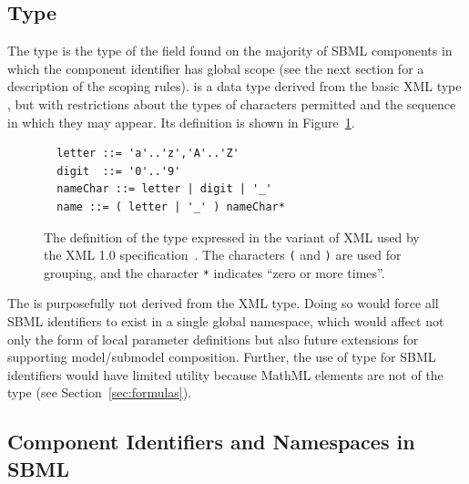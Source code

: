 \documentclass[10pt,twocolumntoc]{cekarticle}
\newcommand{\vref}[1]{\ref{#1}}
\begin{document}
\subsection{Type }
\label{sec:id}

The type  is the type of the  field found on the
majority of SBML components in which the component identifier has global
scope (see the next section for a description of the scoping rules).
 is a data type derived from the basic XML type ,
but with restrictions about the types of characters permitted and the
sequence in which they may appear.  Its definition is shown in
Figure~\vref{fig:id}.

\begin{figure}[h]
  \centering
  \begin{minipage}{3.8in}
\begin{verbatim}
  letter ::= 'a'..'z','A'..'Z'
  digit  ::= '0'..'9'
  nameChar ::= letter | digit | '_'
  name ::= ( letter | '_' ) nameChar*
\end{verbatim}
  \end{minipage}
  \caption{The definition of the type  expressed in the variant
    of XML used by the XML 1.0 specification~\protect\citep{bray:2000}.
    The characters \texttt{(} and \texttt{)} are used for grouping, and the
    character \texttt{*} indicates ``zero or more times''.}
  \label{fig:id}
\end{figure}

The  is purposefully not derived from the XML  type.
Doing so would force all SBML identifiers to exist in a single global
namespace, which would affect not only the form of local parameter
definitions but also future extensions for supporting model/submodel
composition.  Further, the use of  type for SBML identifiers
would have limited utility because MathML  elements are not of
the type  (see Section~\ref{sec:formulas}).


\subsection{Component Identifiers and Namespaces in SBML}
\label{sec:namespaces}
\end{document}
